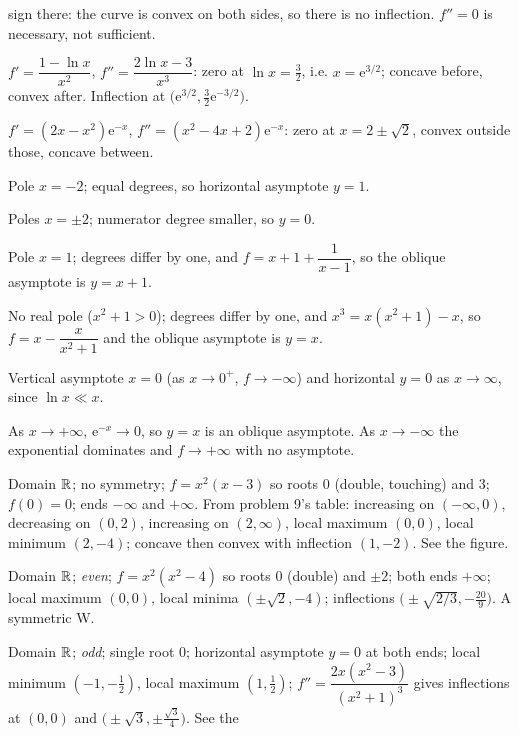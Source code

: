 \begin{solutions}
{        sign} there: the curve is convex on both sides, so there is no
        inflection. $f''=0$ is necessary, not sufficient.
  \item $f'=\dfrac{1-\ln x}{x^{2}}$, $f''=\dfrac{2\ln x-3}{x^{3}}$: zero at
        $\ln x=\tfrac32$, i.e. $x=\mathrm{e}^{3/2}$; concave before, convex
        after. Inflection at
        $\bigl(\mathrm{e}^{3/2},\tfrac32\mathrm{e}^{-3/2}\bigr)$.
  \item $f'=(2x-x^{2})\mathrm{e}^{-x}$,
        $f''=(x^{2}-4x+2)\mathrm{e}^{-x}$: zero at $x=2\pm\sqrt2$, convex
        outside those, concave between.
  \item Pole $x=-2$; equal degrees, so horizontal asymptote $y=1$.
  \item Poles $x=\pm2$; numerator degree smaller, so $y=0$.
  \item Pole $x=1$; degrees differ by one, and
        $f=x+1+\dfrac{1}{x-1}$, so the oblique asymptote is $y=x+1$.
  \item No real pole ($x^{2}+1>0$); degrees differ by one, and
        $x^{3}=x(x^{2}+1)-x$, so $f=x-\dfrac{x}{x^{2}+1}$ and the oblique
        asymptote is $y=x$.
  \item Vertical asymptote $x=0$ (as $x\to0^{+}$, $f\to-\infty$) and
        horizontal $y=0$ as $x\to\infty$, since $\ln x\ll x$.
  \item As $x\to+\infty$, $\mathrm{e}^{-x}\to0$, so $y=x$ is an oblique
        asymptote. As $x\to-\infty$ the exponential dominates and
        $f\to+\infty$ with no asymptote.
  \item Domain $\mathbb{R}$; no symmetry; $f=x^{2}(x-3)$ so roots $0$ (double,
        touching) and $3$; $f(0)=0$; ends $-\infty$ and $+\infty$. From
        problem 9's table: increasing on $(-\infty,0)$, decreasing on
        $(0,2)$, increasing on $(2,\infty)$, local maximum $(0,0)$, local
        minimum $(2,-4)$; concave then convex with inflection $(1,-2)$. See
        the figure.
  \item Domain $\mathbb{R}$; \emph{even}; $f=x^{2}(x^{2}-4)$ so roots $0$ (double)
        and $\pm2$; both ends $+\infty$; local maximum $(0,0)$, local
        minima $(\pm\sqrt2,-4)$; inflections
        $\bigl(\pm\sqrt{2/3},-\tfrac{20}{9}\bigr)$. A symmetric W.
  \item Domain $\mathbb{R}$; \emph{odd}; single root $0$; horizontal asymptote
        $y=0$ at both ends; local minimum $(-1,-\tfrac12)$, local maximum
        $(1,\tfrac12)$;
        $f''=\dfrac{2x(x^{2}-3)}{(x^{2}+1)^{3}}$ gives inflections at
        $(0,0)$ and $\bigl(\pm\sqrt3,\pm\tfrac{\sqrt3}{4}\bigr)$. See the

\end{solutions}
